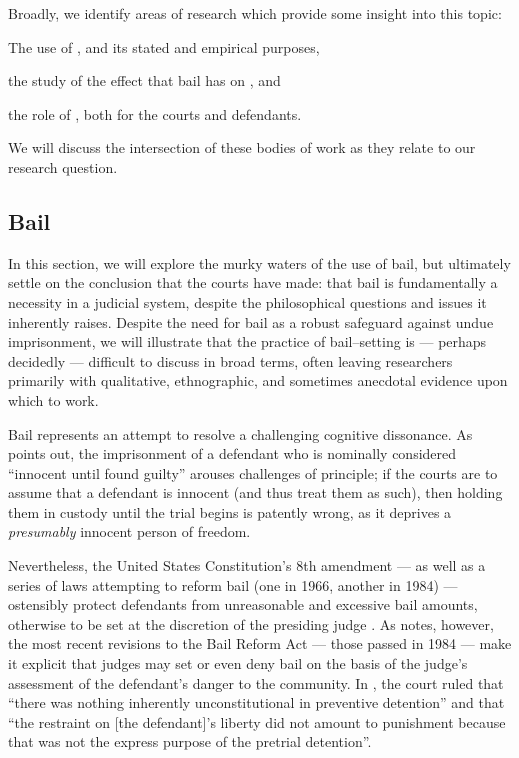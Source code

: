Broadly, we identify \nextitemizecount{} areas of research which provide some insight into this topic:
\begin{inlinelist}
  \item The use of
    \textit{},
    and its stated and empirical purposes,
  \item the study of the effect that bail has on
    \textit{},
    and
  \item the role of
    \textit{},
    both for the courts and defendants.
\end{inlinelist}
We will discuss the intersection of these bodies of work as they relate to our research question.


\subsection{\nmu Bail}\label{subsec:bail}
In this section, we will explore the murky waters of the use of bail,
but ultimately settle on the conclusion that the courts have made:
that bail is fundamentally a necessity in a judicial system,
despite the philosophical questions and issues it inherently raises.
Despite the need for bail as a robust safeguard against undue imprisonment,
we will illustrate that the practice of bail--setting is
--- perhaps decidedly --- difficult to discuss in broad terms,
often leaving researchers primarily with
    qualitative,
    ethnographic, and sometimes
    anecdotal
evidence upon which to work.

Bail represents an attempt to resolve a challenging cognitive dissonance.
As \citet{foote1959bail} points out, the imprisonment of a defendant who is nominally considered
``innocent until found guilty''
arouses challenges of principle;
if the courts are to assume that a defendant is innocent (and thus treat them as such),
then holding them in custody until the trial begins is patently wrong, as it deprives a
\textit{presumably} innocent person of freedom.

Nevertheless, the United States Constitution's 8th amendment
--- as well as a series of laws attempting to reform bail
(one in 1966, another in 1984) ---
ostensibly protect defendants from unreasonable and excessive bail amounts,
otherwise to be set at the discretion of the presiding judge
\citep{berg1985bail}.
As \citeauthor{berg1985bail} notes, however,
the most recent revisions to the Bail Reform Act
--- those passed in 1984 ---
make it explicit that judges may set or even deny bail on the basis of
the judge's assessment of the defendant's danger to the community.
In \citet{1984schall},
the court ruled that
``there was nothing inherently unconstitutional in preventive detention''
and that
``the restraint on [the defendant]'s liberty
did not amount to punishment because
that was not the express purpose of the pretrial detention''.

